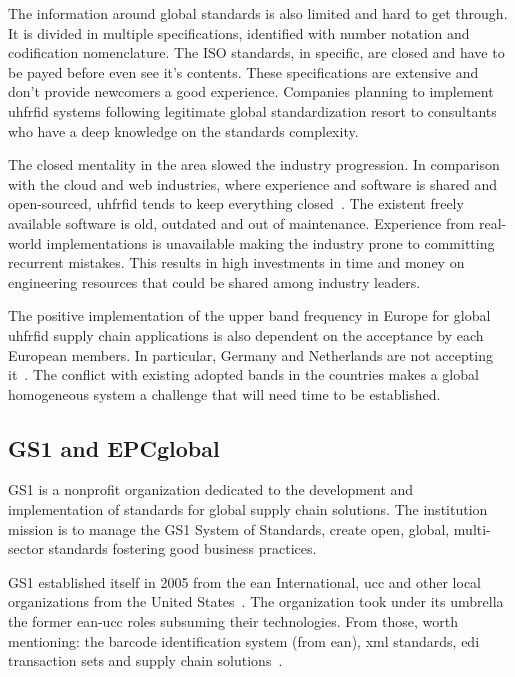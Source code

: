 The information around global standards is also limited and hard to get through. It is divided in multiple specifications, identified with number notation and codification nomenclature. 
The ISO standards, in specific, are closed and have to be payed before even see it's contents.
These specifications are extensive and don't provide newcomers a good experience. 
Companies planning to implement \ac{uhfrfid} systems following legitimate global standardization resort to consultants who have a deep knowledge on the standards complexity.

The closed mentality in the area slowed the industry progression. In comparison with the cloud and web industries, where experience and software is shared and open-sourced, \ac{uhfrfid} tends to keep everything closed~\cite{WhatCouldSlow}. The existent freely available software is old, outdated and out of maintenance. Experience from real-world implementations is unavailable making the industry prone to committing recurrent mistakes. This results in high investments in time and money on engineering resources that could be shared among industry leaders.

The positive implementation of the upper band frequency in Europe for global \ac{uhfrfid} supply chain applications is also dependent on the acceptance by each European members. In particular, Germany and Netherlands are not accepting it~\cite{EUUpperBand}. The conflict with existing adopted bands in the countries makes a global homogeneous system a challenge that will need time to be established.

\subsection{GS1 and EPCglobal}

GS1 is a nonprofit organization dedicated to the development and implementation of standards for global supply chain solutions. 
The institution mission is to manage the GS1 System of Standards, create open, global, multi-sector standards fostering good business practices.

GS1 established itself in 2005 from the \ac{ean} International, \ac{ucc} and other local organizations from the United States~\cite{PublicationLEBENSMITTELZEITUNGa}.
The organization took under its umbrella the former \acs{ean}-\acs{ucc} roles subsuming their technologies. From those, worth mentioning: the barcode identification system (from \ac{ean}), \ac{xml} standards, \ac{edi} transaction sets and supply chain solutions~\cite{lahiriRFIDSourcebook2005}.

